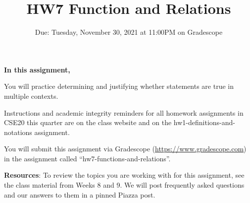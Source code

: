 

\title{HW7 Function and Relations}
\date{Due: Tuesday, November 30, 2021 at 11:00PM on Gradescope}


\maketitle
\thispagestyle{fancy}

{\bf In this assignment,}

You will practice determining and justifying whether 
statements are true in multiple contexts.

Instructions and academic integrity reminders for all homework assignments in 
CSE20 this quarter are on the class website and on the hw1-definitions-and-notations
assignment.

You will submit this assignment via Gradescope
(\href{https://www.gradescope.com}{https://www.gradescope.com}) 
in the assignment called ``hw7-functions-and-relations''.

{\bf Resources}: To review the topics you are working with 
for this assignment, see the class material from Weeks 8 and 9.
We will post frequently asked questions and our answers to them in a 
pinned Piazza post.


